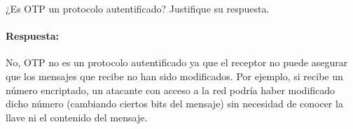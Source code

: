 
¿Es OTP un protocolo autentificado? Justifique su respuesta.
\paragraph{Respuesta:} No, OTP no es un protocolo autentificado ya que el receptor no puede asegurar que los mensajes que recibe no han sido modificados. Por ejemplo, si recibe un número encriptado, un atacante con acceso a la red podría haber modificado dicho número (cambiando ciertos bits del mensaje) sin necesidad de conocer la llave ni el contenido del mensaje.
